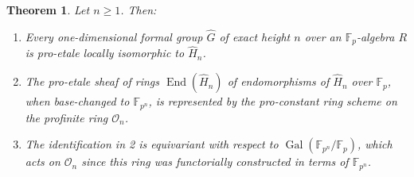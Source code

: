 \documentclass[12pt]{article}
\newtheorem{theorem}{Theorem}[section]
\newcommand{\on}{\operatorname}
\begin{document}
\begin{theorem}\label{heightn}
Let $n\geq 1$.  Then:
\begin{enumerate}
\item Every one-dimensional formal group $\widehat{G}$ of exact height $n$ over an $\mathbb{F}_p$-algebra $R$ is pro-etale locally isomorphic to $\widehat{H}_n$.
\item The pro-etale sheaf of rings $\on{End}(\widehat{H}_n)$ of endomorphisms of $\widehat{H}_n$ over $\mathbb{F}_p$, when base-changed to $\mathbb{F}_{p^n}$, is represented by the pro-constant ring scheme on the profinite ring $\mathcal{O}_n$.
\item The identification in 2 is equivariant with respect to $\on{Gal}(\mathbb{F}_{p^n}/\mathbb{F}_p)$, which acts on $\mathcal{O}_n$ since this ring was functorially constructed in terms of $\mathbb{F}_{p^n}$.
\end{enumerate}
\end{theorem}
\end{document}
